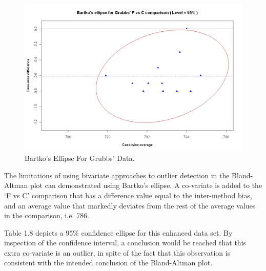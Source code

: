 \documentclass[compress]{beamer}        %
\begin{document}
\begin{frame}

\begin{figure}[h!]
  \includegraphics[width=130mm]{GrubbsBartko.jpeg}
  \caption{Bartko's Ellipse For Grubbs' Data.}\label{GrubbsBartko}
\end{figure}
\end{frame}
\begin{frame}
The limitations of using bivariate approaches to outlier detection
in the Bland-Altman plot can demonstrated using Bartko's ellipse.
A co-variate is added to the `F vs C' comparison that has a
difference value equal to the inter-method bias, and an average
value that markedly deviates from the rest of the average values
in the comparison, i.e. 786. 
\end{frame}

\begin{frame}
Table 1.8 depicts a $95\%$ confidence
ellipse for this enhanced data set. By inspection of the
confidence interval, a conclusion would be reached that this extra
co-variate is an outlier, in spite of the fact that this
observation is consistent with the intended conclusion of the
Bland-Altman plot.
\end{frame}
\end{document}
